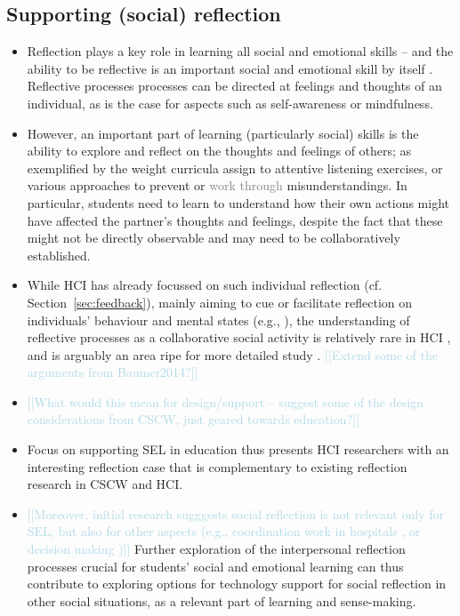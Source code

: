 \documentclass[prodmode,acmtochi]{acmsmall}
\newcommand{\todo}[1]{\textrm{\textrm{\textcolor{LightBlue}{[[#1]]} } } }
\newcommand{\rephrase}[1]{\textrm{\textrm{\textcolor{gray}{#1}}}}
\begin{document}
\subsection{Supporting (social) reflection}

\begin{itemize}
	\item 
Reflection plays a key role in learning all social and emotional skills -- and the ability to be reflective is an important social and emotional skill by itself \cite{Cohen2001,r,r}. Reflective processes processes can be directed at feelings and thoughts of an individual, as is the case for aspects such as self-awareness or mindfulness. 
		
		
\item However, an important part of learning (particularly social) skills is the ability to explore and reflect on the thoughts and feelings of others;  as exemplified by the weight curricula assign to attentive listening exercises, or various approaches to prevent or \rephrase{work through} misunderstandings.
%
In particular, students need to learn to understand how their own actions might have affected the partner’s thoughts and feelings, despite the fact that these might not be directly observable and may need to be collaboratively established.


\item While HCI has already focussed on such individual reflection (cf. Section~\ref{sec:feedback}), mainly aiming to cue or facilitate reflection on individuals' behaviour and mental states (e.g., \cite{Sas2011,Stahl2008,Thieme2011,Isaacs2013}), the understanding of reflective processes as a collaborative social activity is relatively rare in HCI \cite{Fleck2012,Prilla2012}, and is arguably an area ripe for more detailed study \cite{Baumer2014}. 
\todo{Extend some of the arguments from Baumer2014?}

\item \todo{What would this mean for design/support -- suggest some of the design considerations from CSCW, just geared towards education?}

\item Focus on supporting SEL in education thus presents HCI researchers with an interesting reflection case that is complementary to  existing reflection research in CSCW and HCI.  

\item \todo{Moreover, initial research sugggests social reflection is not relevant only for SEL, but also for other aspects (e.g., coordination work in hospitals \cite{Prilla}, or decision making \cite{Dey})} Further exploration of the interpersonal reflection processes crucial for students' social and emotional learning can thus contribute to exploring options for technology support for social reflection in other social situations, as a relevant part of learning and sense-making.
\bigskip


\end{itemize}
\end{document}
